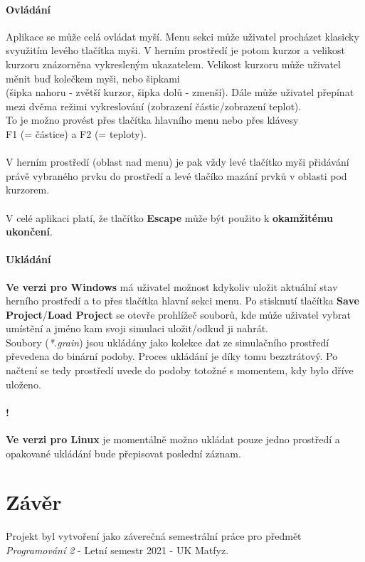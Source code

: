 \documentclass[a4paper, 12pt]{article}
\begin{document}
\paragraph{Ovládání}
Aplikace se může celá ovládat myší. Menu sekci může uživatel procházet klasicky
svyužitím levého tlačítka myši. V herním prostředí je potom kurzor a velikost
kurzoru znázorněna vykresleným ukazatelem. Velikost kurzoru může uživatel měnit
buď kolečkem myši, nebo šipkami \\(šipka nahoru - zvětší kurzor,
šipka dolů - zmenší). Dále může uživatel přepínat mezi dvěma režimi vykreslování (zobrazení
částic/zobrazení teplot). \\To je možno provést přes tlačítka hlavního menu nebo
přes klávesy \\F1 (= částice) a F2 (= teploty).

\paragraph{}
V herním prostředí (oblast nad menu) je pak vždy levé tlačítko myši přidávání
právě vybraného prvku do prostředí a levé tlačíko mazání prvků v oblasti pod
kurzorem. 

\paragraph{}
V celé aplikaci platí, že tlačítko \textbf{Escape} může být použito k \textbf{okamžitému
ukončení}.

\paragraph{Ukládání}
\textbf{Ve verzi pro Windows} má uživatel možnost kdykoliv uložit aktuální stav 
herního prostředí a to přes tlačítka hlavní sekci menu. Po stisknutí tlačítka
\textbf{Save Project}/\textbf{Load Project} se otevře prohlížeč souborů, kde
může uživatel vybrat umístění a jméno kam svoji simulaci uložit/odkud ji
nahrát. \\
Soubory (\emph{*.grain}) jsou ukládány jako kolekce dat ze simulačního prostředí převedena do
binární podoby. Proces ukládání je díky tomu bezztrátový. Po načtení se tedy
prostředí uvede do podoby totožné s momentem, kdy bylo dříve uloženo.

\paragraph{!}
\textbf{Ve verzi pro Linux} je momentálně možno ukládat pouze jedno prostředí a
opakované ukládání bude přepisovat poslední záznam.

\section{Závěr}
Projekt byl vytvoření jako záverečná semestrální práce pro předmět
\\\emph{Programování 2} - Letní semestr 2021 - UK Matfyz.
\end{document}
